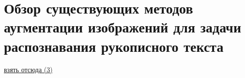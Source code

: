\section{Обзор существующих методов аугментации изображений для задачи распознавания рукописного текста}
\label{sec:Chapter2} 

\href{https://arxiv.org/pdf/2104.07787v2}{взять отсюда (3)}

\newpage
